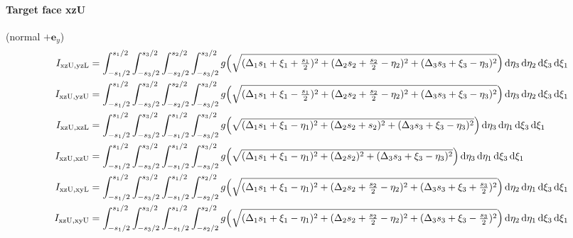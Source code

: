 \paragraph{Target face xzU} (normal $+\mathbf{e}_y$)
\begin{align*}
I_{\mathrm{xzU},\mathrm{yzL}} &= \int_{-s_1/2}^{s_1/2}\int_{-s_3/2}^{s_3/2}\int_{-s_2/2}^{s_2/2}\int_{-s_3/2}^{s_3/2} g\Bigl(\sqrt{(\Delta_1 s_1 + \xi_1 + \tfrac{s_1}{2})^2 + (\Delta_2 s_2 + \tfrac{s_2}{2} - \eta_2)^2 + (\Delta_3 s_3 + \xi_3 - \eta_3)^2}\Bigr)\,\mathrm{d}\eta_3\,\mathrm{d}\eta_2\,\mathrm{d}\xi_3\,\mathrm{d}\xi_1 \\I_{\mathrm{xzU},\mathrm{yzU}} &= \int_{-s_1/2}^{s_1/2}\int_{-s_3/2}^{s_3/2}\int_{-s_2/2}^{s_2/2}\int_{-s_3/2}^{s_3/2} g\Bigl(\sqrt{(\Delta_1 s_1 + \xi_1 - \tfrac{s_1}{2})^2 + (\Delta_2 s_2 + \tfrac{s_2}{2} - \eta_2)^2 + (\Delta_3 s_3 + \xi_3 - \eta_3)^2}\Bigr)\,\mathrm{d}\eta_3\,\mathrm{d}\eta_2\,\mathrm{d}\xi_3\,\mathrm{d}\xi_1 \\I_{\mathrm{xzU},\mathrm{xzL}} &= \int_{-s_1/2}^{s_1/2}\int_{-s_3/2}^{s_3/2}\int_{-s_1/2}^{s_1/2}\int_{-s_3/2}^{s_3/2} g\Bigl(\sqrt{(\Delta_1 s_1 + \xi_1 - \eta_1)^2 + (\Delta_2 s_2 + s_2)^2 + (\Delta_3 s_3 + \xi_3 - \eta_3)^2}\Bigr)\,\mathrm{d}\eta_3\,\mathrm{d}\eta_1\,\mathrm{d}\xi_3\,\mathrm{d}\xi_1 \\I_{\mathrm{xzU},\mathrm{xzU}} &= \int_{-s_1/2}^{s_1/2}\int_{-s_3/2}^{s_3/2}\int_{-s_1/2}^{s_1/2}\int_{-s_3/2}^{s_3/2} g\Bigl(\sqrt{(\Delta_1 s_1 + \xi_1 - \eta_1)^2 + (\Delta_2 s_2)^2 + (\Delta_3 s_3 + \xi_3 - \eta_3)^2}\Bigr)\,\mathrm{d}\eta_3\,\mathrm{d}\eta_1\,\mathrm{d}\xi_3\,\mathrm{d}\xi_1 \\I_{\mathrm{xzU},\mathrm{xyL}} &= \int_{-s_1/2}^{s_1/2}\int_{-s_3/2}^{s_3/2}\int_{-s_1/2}^{s_1/2}\int_{-s_2/2}^{s_2/2} g\Bigl(\sqrt{(\Delta_1 s_1 + \xi_1 - \eta_1)^2 + (\Delta_2 s_2 + \tfrac{s_2}{2} - \eta_2)^2 + (\Delta_3 s_3 + \xi_3 + \tfrac{s_3}{2})^2}\Bigr)\,\mathrm{d}\eta_2\,\mathrm{d}\eta_1\,\mathrm{d}\xi_3\,\mathrm{d}\xi_1 \\I_{\mathrm{xzU},\mathrm{xyU}} &= \int_{-s_1/2}^{s_1/2}\int_{-s_3/2}^{s_3/2}\int_{-s_1/2}^{s_1/2}\int_{-s_2/2}^{s_2/2} g\Bigl(\sqrt{(\Delta_1 s_1 + \xi_1 - \eta_1)^2 + (\Delta_2 s_2 + \tfrac{s_2}{2} - \eta_2)^2 + (\Delta_3 s_3 + \xi_3 - \tfrac{s_3}{2})^2}\Bigr)\,\mathrm{d}\eta_2\,\mathrm{d}\eta_1\,\mathrm{d}\xi_3\,\mathrm{d}\xi_1
\end{align*}
